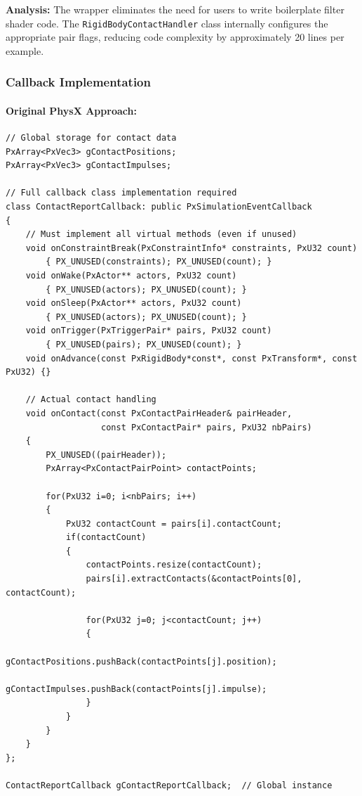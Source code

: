 \textbf{Analysis:} The wrapper eliminates the need for users to write boilerplate filter shader code. The \texttt{RigidBodyContactHandler} class internally configures the appropriate pair flags, reducing code complexity by approximately 20 lines per example.

\subsubsection{Callback Implementation}

\paragraph{Original PhysX Approach:}

\begin{lstlisting}[style=cpp, caption=Original Callback Class Implementation]
// Global storage for contact data
PxArray<PxVec3> gContactPositions;
PxArray<PxVec3> gContactImpulses;

// Full callback class implementation required
class ContactReportCallback: public PxSimulationEventCallback
{
    // Must implement all virtual methods (even if unused)
    void onConstraintBreak(PxConstraintInfo* constraints, PxU32 count)
        { PX_UNUSED(constraints); PX_UNUSED(count); }
    void onWake(PxActor** actors, PxU32 count)
        { PX_UNUSED(actors); PX_UNUSED(count); }
    void onSleep(PxActor** actors, PxU32 count)
        { PX_UNUSED(actors); PX_UNUSED(count); }
    void onTrigger(PxTriggerPair* pairs, PxU32 count)
        { PX_UNUSED(pairs); PX_UNUSED(count); }
    void onAdvance(const PxRigidBody*const*, const PxTransform*, const PxU32) {}

    // Actual contact handling
    void onContact(const PxContactPairHeader& pairHeader,
                   const PxContactPair* pairs, PxU32 nbPairs)
    {
        PX_UNUSED((pairHeader));
        PxArray<PxContactPairPoint> contactPoints;

        for(PxU32 i=0; i<nbPairs; i++)
        {
            PxU32 contactCount = pairs[i].contactCount;
            if(contactCount)
            {
                contactPoints.resize(contactCount);
                pairs[i].extractContacts(&contactPoints[0], contactCount);

                for(PxU32 j=0; j<contactCount; j++)
                {
                    gContactPositions.pushBack(contactPoints[j].position);
                    gContactImpulses.pushBack(contactPoints[j].impulse);
                }
            }
        }
    }
};

ContactReportCallback gContactReportCallback;  // Global instance
\end{lstlisting}

